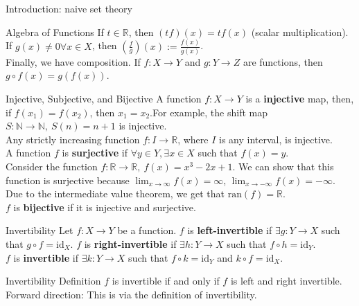 \documentclass[8pt]{extarticle}
\begin{document}
\begin{problem}{Introduction: naive set theory}
\begin{problem}{Algebra of Functions}
      If $t\in \mathbb{R}$, then $(tf)(x) = tf(x)$ (scalar multiplication). If $g(x)\neq 0\forall x\in X$, then $\left(\frac{f}{g}\right)(x) := \frac{f(x)}{g(x)}$.\\

      Finally, we have composition. If $f:X\rightarrow Y$ and $g:Y\rightarrow Z$ are functions, then $g\circ f(x) = g(f(x))$.
    \end{problem}
    \begin{problem}{Injective, Subjective, and Bijective}
      A function $f:X\rightarrow Y$ is a \textbf{injective} map, then, if $f(x_1) = f(x_2)$, then $x_1 = x_2$.For example, the shift map $S:\mathbb{N} \rightarrow \mathbb{N},~S(n) = n+1$ is injective.\\

      Any strictly increasing function $f:I\rightarrow \mathbb{R}$, where $I$ is any interval, is injective.\\

      A function $f$ is \textbf{surjective} if $\forall y\in Y, \exists x\in X$ such that $f(x) = y$.\\

      Consider the function $f:\mathbb{R} \rightarrow \mathbb{R},~f(x) = x^3-2x+1$. We can show that this function is surjective because $\lim_{x\rightarrow \infty}f(x) = \infty$, $\lim_{x\rightarrow -\infty} f(x) = -\infty$. Due to the intermediate value theorem, we get that $\textrm{ran}(f) = \mathbb{R}$.\\

      $f$ is \textbf{bijective} if it is injective and surjective.
    \end{problem}
    \begin{problem}{Invertibility}
      Let $f:X\rightarrow Y$ be a function. $f$ is \textbf{left-invertible} if $\exists g:Y\rightarrow X$ such that $g\circ f = \textrm{id}_X$. $f$ is \textbf{right-invertible} if $\exists h:Y\rightarrow X$ such that $f\circ h = \textrm{id}_Y$.\\

      $f$ is \textbf{invertible} if $\exists k:Y\rightarrow X$ such that $f\circ k = \textrm{id}_Y$ and $k\circ f = \textrm{id}_X$.\\

      \begin{problem}{Invertibility Definition}
        $f$ is invertible if and only if $f$ is left and right invertible.
        \tcblower
          Forward direction: This is via the definition of invertibility.\\


\end{problem}
\end{problem}
\end{problem}
\end{document}

